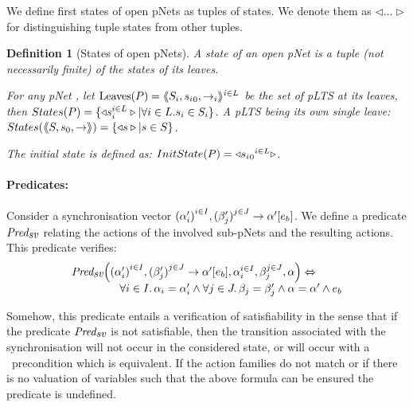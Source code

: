 \documentclass{lmcs}
\newtheorem{definition}{Definition}
\newtheorem{example}{Example}
\begin{document}
We define first states of open pNets as tuples of states. We denote them
 as $\triangleleft\ldots\triangleright$ for distinguishing tuple 
states from other tuples.
\begin{definition}[States of open pNets]\label{def-states}
  A state of an open pNet is a tuple (not necessarily finite) of the
  states of its leaves.

  For any pNet \pNet, let $\operatorname{Leaves}(P) = \langle\hspace{-0.58ex}\langle S_i,{s_i}_0, \to_i\rangle\hspace{-0.58ex}\rangle^{i \in L}$ be 
  the set of pLTS at its leaves,
  then $States(P) = \{\triangleleft s_i^{i\in L}
  \triangleright| \forall i\in L. s_i \in S_i\}$.
A pLTS being its own single leave:
  $States(\langle\hspace{-0.58ex}\langle S,s_0, \to\rangle\hspace{-0.58ex}\rangle) = \{\triangleleft s \triangleright| s \in S\}$.

The initial state is defined as:
$InitState(P) = \triangleleft {{s_i}_0}^{i\in L}  \triangleright$.
\end{definition}




\paragraph{Predicates:}
Consider a synchronisation vector ${(\alpha'_i)}^{i\in I}, {(\beta'_j)}^{j\in J}\to \alpha' [e_b]$. We 
define a
predicate $\Predsv$ relating
the actions of the involved sub-pNets and the resulting actions. This predicate verifies:
\[\begin{array}{l}\Predsv \Big(\SV{{(\alpha'_i)}^{i\in I}, {(\beta'_j)}^{j\in J}} 
{\alpha'} 
{e_b}, \alpha_i^{i\in I}, \beta_j^{j\in J}, \alpha\Big)\Leftrightarrow \\~\qquad\qquad%
%
\forall i\in I.\, \alpha_i=\alpha'_i\land \forall j \in J.\, \beta_j=\beta'_j \land 
\alpha=\alpha' 
\land e_b
\end{array} 
\]

Somehow, this predicate entails a verification of satisfiability in the sense that if the 
predicate $\Predsv$ is not satisfiable, then the transition associated with the 
synchronisation will not occur in the considered state, or will occur with a \False\ precondition which is equivalent.
If the action families do not match or if there is no valuation of
variables such that the above formula can be ensured the predicate is undefined.
\end{document}
